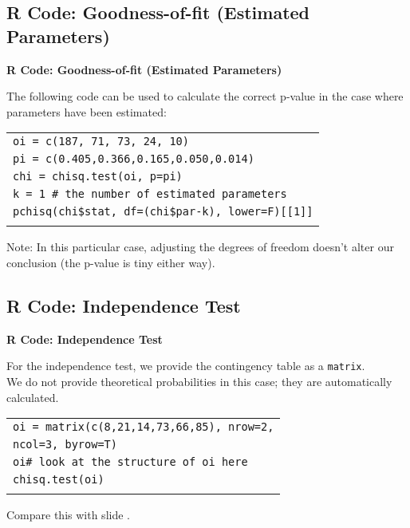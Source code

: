 \documentclass[compress]{beamer}        %
\makeatletter
\newcommand{\tcb}{\textcolor{beamer@blendedblue}}
\makeatother
\begin{document}
\subsection{R Code: Goodness-of-fit (Estimated Parameters)}
\begin{frame}{\bf \tcb{R Code: Goodness-of-fit (Estimated Parameters)}}

The following code can be used to calculate the correct p-value in the case where parameters have been estimated:\\[0.5cm]
\begin{tabular}{|l|}
\hline
\texttt{oi = c(187, 71, 73, 24, 10)}\\[0.2cm]
\texttt{pi = c(0.405,0.366,0.165,0.050,0.014)}\\[0.2cm]
\texttt{chi = chisq.test(oi, p=pi)}\\[0.2cm]
\texttt{k = 1 \qquad \# the number of estimated parameters}\\[0.2cm]
\texttt{pchisq(chi\$stat, df=(chi\$par-k), lower=F)[[1]]}\\
\hline
\multicolumn{1}{c}{}\\[0.2cm]
\end{tabular}

Note: In this particular case, adjusting the degrees of freedom doesn't alter our conclusion (the p-value is tiny either way).

\end{frame}




\subsection{R Code: Independence Test}
\begin{frame}{\bf \tcb{R Code: Independence Test}}

For the independence test, we provide the contingency table as a \texttt{matrix}.\\[0.3cm]
We do not provide theoretical probabilities in this case; they are automatically calculated.\\[0.5cm]
\begin{tabular}{|l|}
\hline
\texttt{oi = matrix(c(8,21,14,73,66,85), nrow=2,}\\
\hspace{6cm}\texttt{ncol=3, byrow=T)}\\[0.2cm]
\texttt{oi\qquad\# look at the structure of oi here}\\[0.2cm]
\texttt{chisq.test(oi)}\\
\hline
\multicolumn{1}{c}{}\\[0.2cm]
\end{tabular}

Compare this with slide \pageref{indep}.\\[0.5cm]

\end{frame}
\end{document}
